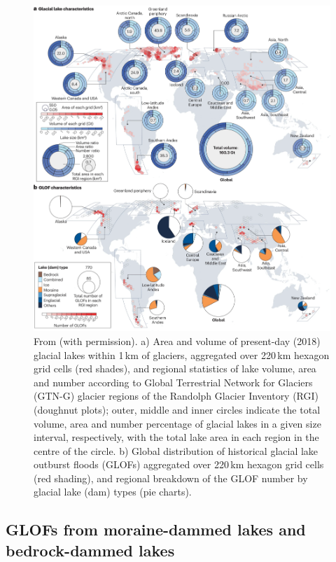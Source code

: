 \begin{figure}
    \centering
    \includegraphics[width=1\linewidth]{chapters/introduction/Fig1_Zhnag&al2024.pdf}
    \caption{From \cite{Zhang&al2024} (with permission). a) Area and volume of present-day (2018) glacial lakes within 1\,km of glaciers, aggregated over 220\,km hexagon grid cells (red shades), and regional statistics of lake volume, area and number according to Global Terrestrial Network for Glaciers (GTN-G) glacier regions of the Randolph Glacier Inventory (RGI)(doughnut plots); outer, middle and inner circles indicate the total volume, area and number percentage of glacial lakes in a given size interval, respectively, with the total lake area in each region in the centre of the circle. b) Global distribution of historical glacial lake outburst floods (GLOFs) aggregated over 220\,km hexagon grid cells (red shading), and regional breakdown of the GLOF number by glacial lake (dam) types (pie charts).}
    \label{fig:fig1_zhnagetal2024}
\end{figure}


\subsection{GLOFs from moraine-dammed lakes and bedrock-dammed lakes}%

